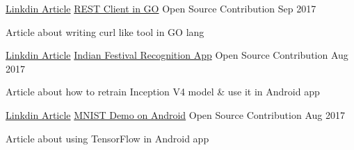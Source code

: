 \begin{cventries}
  \cventry
    {\href{https://www.linkedin.com/pulse/writing-command-line-rest-api-client-go-lang-ishwar-sawale/}{Linkdin Article}} %
    {\href{https://www.linkedin.com/pulse/writing-command-line-rest-api-client-go-lang-ishwar-sawale/}{REST Client in GO}} %
    {Open Source Contribution} %
    {Sep 2017} %
    {
      \begin{cvitems} %
        \item {Article about writing curl like tool in GO lang}
      \end{cvitems}
    }
    
  \cventry
    {\href{https://www.linkedin.com/pulse/indian-festival-recognition-app-ishwar-sawale/}{Linkdin Article}} %
    {\href{https://www.linkedin.com/pulse/indian-festival-recognition-app-ishwar-sawale/}{Indian Festival Recognition App}} %
    {Open Source Contribution} %
    {Aug 2017} %
    {
      \begin{cvitems} %
        \item {Article about how to retrain Inception V4 model \& use it in Android app}
      \end{cvitems}
    }

    \cventry
    {\href{https://www.linkedin.com/pulse/handwritten-digits-classification-from-mnist-android-keras-sawale/}{Linkdin Article}} %
    {\href{https://www.linkedin.com/pulse/handwritten-digits-classification-from-mnist-android-keras-sawale/}{MNIST Demo on Android}} %
    {Open Source Contribution} %
    {Aug 2017} %
    {
      \begin{cvitems} %
        \item {Article about using TensorFlow in Android app} 
      \end{cvitems}
    }









\end{cventries}
